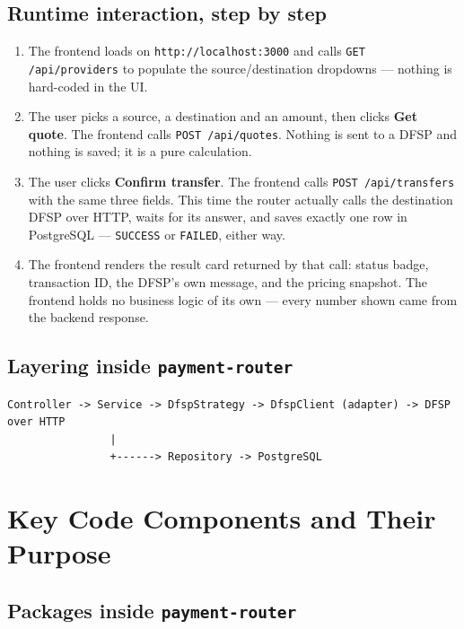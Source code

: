 \documentclass[12pt,a4paper]{article}
\begin{document}
\subsection{Runtime interaction, step by step}

\begin{enumerate}
\item The frontend loads on \texttt{http://localhost:3000} and calls \texttt{GET
/api/providers} to populate the source/destination dropdowns --- nothing is
hard-coded in the UI.
\item The user picks a source, a destination and an amount, then clicks
\textbf{Get quote}. The frontend calls \texttt{POST /api/quotes}. Nothing is sent to
a DFSP and nothing is saved; it is a pure calculation.
\item The user clicks \textbf{Confirm transfer}. The frontend calls \texttt{POST
/api/transfers} with the same three fields. This time the router actually calls the
destination DFSP over HTTP, waits for its answer, and saves exactly one row in
PostgreSQL --- \texttt{SUCCESS} or \texttt{FAILED}, either way.
\item The frontend renders the result card returned by that call: status badge,
transaction ID, the DFSP's own message, and the pricing snapshot. The frontend holds
no business logic of its own --- every number shown came from the backend response.
\end{enumerate}

\subsection{Layering inside \texttt{payment-router}}

\begin{lstlisting}
Controller -> Service -> DfspStrategy -> DfspClient (adapter) -> DFSP over HTTP
                |
                +------> Repository -> PostgreSQL
\end{lstlisting}

\clearpage
\section{Key Code Components and Their Purpose}
\label{sec:components}

\subsection{Packages inside \texttt{payment-router}}
\end{document}
